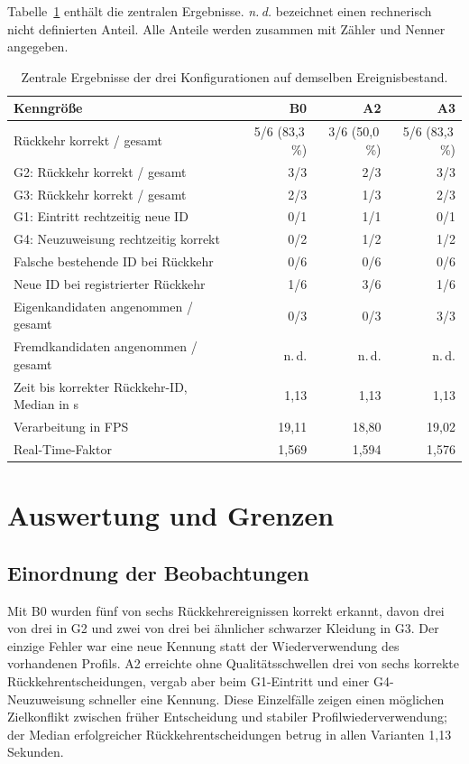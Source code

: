 \documentclass[runningheads,a4paper]{llncs}
\begin{document}
Tabelle~\ref{tab:results-reid} enthält die zentralen Ergebnisse. \emph{n.\,d.} bezeichnet einen rechnerisch nicht definierten Anteil. Alle Anteile werden zusammen mit Zähler und Nenner angegeben.
\begin{table}[tbp]
\caption{Zentrale Ergebnisse der drei Konfigurationen auf demselben Ereignisbestand.}
\label{tab:results-reid}
\centering
\small
\begin{tabularx}{\linewidth}{@{}Xrrr@{}}
\toprule
Kenngrö{\ss}e & B0 & A2 & A3 \\
\midrule
Rückkehr korrekt / gesamt & 5/6 (83,3\,\%) & 3/6 (50,0\,\%) & 5/6 (83,3\,\%) \\
G2: Rückkehr korrekt / gesamt & 3/3 & 2/3 & 3/3 \\
G3: Rückkehr korrekt / gesamt & 2/3 & 1/3 & 2/3 \\
G1: Eintritt rechtzeitig neue ID & 0/1 & 1/1 & 0/1 \\
G4: Neuzuweisung rechtzeitig korrekt & 0/2 & 1/2 & 1/2 \\
Falsche bestehende ID bei Rückkehr & 0/6 & 0/6 & 0/6 \\
Neue ID bei registrierter Rückkehr & 1/6 & 3/6 & 1/6 \\
Eigenkandidaten angenommen / gesamt & 0/3 & 0/3 & 3/3 \\
Fremdkandidaten angenommen / gesamt & n.\,d. & n.\,d. & n.\,d. \\
Zeit bis korrekter Rückkehr-ID, Median in s & 1,13 & 1,13 & 1,13 \\
Verarbeitung in FPS & 19,11 & 18,80 & 19,02 \\
Real-Time-Faktor & 1,569 & 1,594 & 1,576 \\
\bottomrule
\end{tabularx}
\end{table}

\section{Auswertung und Grenzen}
\label{sec:discussion}

\subsection{Einordnung der Beobachtungen}

Mit B0 wurden fünf von sechs Rückkehrereignissen korrekt erkannt, davon drei von drei in G2 und zwei von drei bei ähnlicher schwarzer Kleidung in G3. Der einzige Fehler war eine neue Kennung statt der Wiederverwendung des vorhandenen Profils. A2 erreichte ohne Qualitätsschwellen drei von sechs korrekte Rückkehrentscheidungen, vergab aber beim G1-Eintritt und einer G4-Neuzuweisung schneller eine Kennung. Diese Einzelfälle zeigen einen möglichen Zielkonflikt zwischen früher Entscheidung und stabiler Profilwiederverwendung; der Median erfolgreicher Rückkehrentscheidungen betrug in allen Varianten 1,13 Sekunden.
\end{document}
